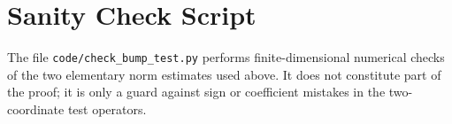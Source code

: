 \documentclass[11pt]{article}
\begin{document}
\section*{Sanity Check Script}

The file \texttt{code/check\_bump\_test.py} performs finite-dimensional
numerical checks of the two elementary norm estimates used above. It does not
constitute part of the proof; it is only a guard against sign or coefficient
mistakes in the two-coordinate test operators.
\end{document}

